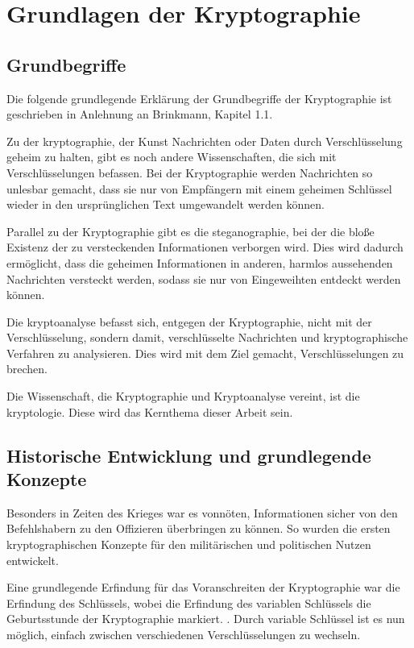 \newpage
\section{Grundlagen der Kryptographie}
\subsection{Grundbegriffe}
Die folgende grundlegende Erklärung der Grundbegriffe der Kryptographie ist
geschrieben in Anlehnung an Brinkmann, Kapitel 1.1. \par Zu der \gls{kryptographie},
der Kunst Nachrichten oder Daten durch Verschlüsselung geheim zu halten, gibt es
noch andere Wissenschaften, die sich mit Verschlüsselungen befassen. Bei der
Kryptographie werden Nachrichten so unlesbar gemacht, dass sie nur von Empfängern
mit einem geheimen Schlüssel wieder in den ursprünglichen Text umgewandelt werden
können.

\par Parallel zu der Kryptographie gibt es die \gls{steganographie},
bei der die bloße Existenz der zu versteckenden Informationen verborgen wird. Dies
wird dadurch ermöglicht, dass die geheimen Informationen in anderen, harmlos aussehenden
Nachrichten versteckt werden, sodass sie nur von Eingeweihten entdeckt werden
können.

\par Die \gls{kryptoanalyse} befasst sich, entgegen der Kryptographie,
nicht mit der Verschlüsselung, sondern damit, verschlüsselte Nachrichten und
kryptographische Verfahren zu analysieren. Dies wird mit dem Ziel gemacht,
Verschlüsselungen zu brechen.

\par Die Wissenschaft, die Kryptographie und Kryptoanalyse vereint, ist die
\gls{kryptologie}. Diese wird das Kernthema dieser Arbeit sein. \autocite[\pagef~5]{brinkmann_vak_2001}

\subsection{Historische Entwicklung und grundlegende Konzepte}
Besonders in Zeiten des Krieges war es vonnöten, Informationen sicher von den Befehlshabern
zu den Offizieren überbringen zu können. So wurden die ersten kryptographischen
Konzepte für den militärischen und politischen Nutzen entwickelt. \autocite[]{beutelspacher_kurze_2017}

\par Eine grundlegende Erfindung für das Voranschreiten der Kryptographie war die Erfindung des Schlüssels, wobei die Erfindung des variablen Schlüssels die Geburtsstunde der Kryptographie markiert. \autocite[]{beutelspacher_kurze_2017}. Durch variable Schlüssel ist es nun möglich, einfach zwischen verschiedenen Verschlüsselungen zu wechseln.

